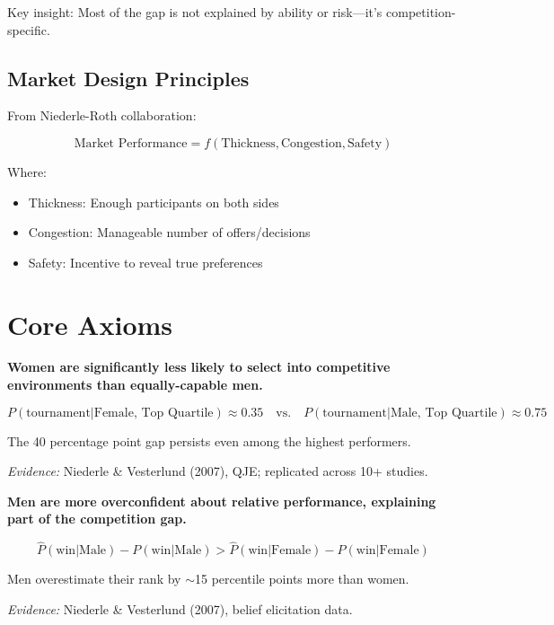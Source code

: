 Key insight: Most of the gap is not explained by ability or risk---it's competition-specific.

\subsection{Market Design Principles}

From Niederle-Roth collaboration:

\begin{equation}
\text{Market Performance} = f(\text{Thickness}, \text{Congestion}, \text{Safety})
\end{equation}

Where:
\begin{itemize}
    \item Thickness: Enough participants on both sides
    \item Congestion: Manageable number of offers/decisions
    \item Safety: Incentive to reveal true preferences
\end{itemize}

\section{Core Axioms}

\begin{tcolorbox}[colback=red!5!white,colframe=red!75!black,title=Axiom MN-1: Gender Competition Gap]
\textbf{Women are significantly less likely to select into competitive environments than equally-capable men.}

\begin{equation}
P(\text{tournament} | \text{Female, Top Quartile}) \approx 0.35 \quad \text{vs.} \quad P(\text{tournament} | \text{Male, Top Quartile}) \approx 0.75
\end{equation}

The 40 percentage point gap persists even among the highest performers.

\textit{Evidence:} Niederle \& Vesterlund (2007), QJE; replicated across 10+ studies.
\end{tcolorbox}

\begin{tcolorbox}[colback=red!5!white,colframe=red!75!black,title=Axiom MN-2: Overconfidence Channel]
\textbf{Men are more overconfident about relative performance, explaining part of the competition gap.}

\begin{equation}
\hat{P}(\text{win} | \text{Male}) - P(\text{win} | \text{Male}) > \hat{P}(\text{win} | \text{Female}) - P(\text{win} | \text{Female})
\end{equation}

Men overestimate their rank by $\sim$15 percentile points more than women.

\textit{Evidence:} Niederle \& Vesterlund (2007), belief elicitation data.
\end{tcolorbox}

